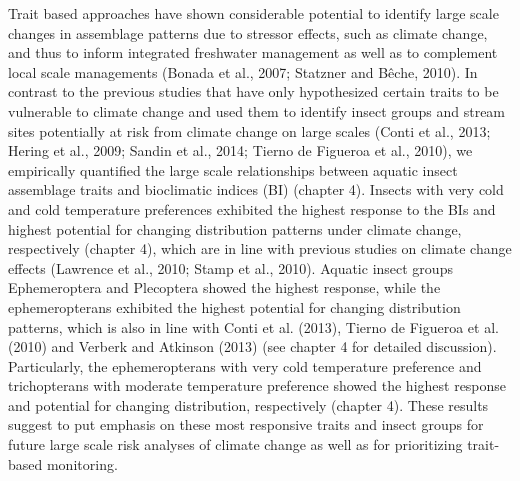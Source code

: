 Trait based approaches have shown considerable potential to identify large scale changes in assemblage patterns due to stressor effects, such as climate change, and thus to inform integrated freshwater management as well as to complement local scale managements (Bonada et al., 2007; Statzner and Bêche, 2010). In contrast to the previous studies that have only hypothesized certain traits to be vulnerable to climate change and used them to identify insect groups and stream sites potentially at risk from climate change on large scales (Conti et al., 2013; Hering et al., 2009; Sandin et al., 2014; Tierno de Figueroa et al., 2010), we empirically quantified the large scale relationships between aquatic insect assemblage traits and bioclimatic indices (BI) (chapter 4). Insects with very cold and cold temperature preferences exhibited the highest response to the BIs and highest potential for changing distribution patterns under climate change, respectively (chapter 4), which are in line with previous studies on climate change effects (Lawrence et al., 2010; Stamp et al., 2010). Aquatic insect groups Ephemeroptera and Plecoptera showed the highest response, while the ephemeropterans exhibited the highest potential for changing distribution patterns, which is also in line with Conti et al. (2013), Tierno de Figueroa et al. (2010) and Verberk and Atkinson (2013) (see chapter 4 for detailed discussion). Particularly, the ephemeropterans with very cold temperature preference and trichopterans with moderate temperature preference showed the highest response and potential for changing distribution, respectively (chapter 4). These results suggest to put emphasis on these most responsive traits and insect groups for future large scale risk analyses of climate change as well as for prioritizing trait-based monitoring.

